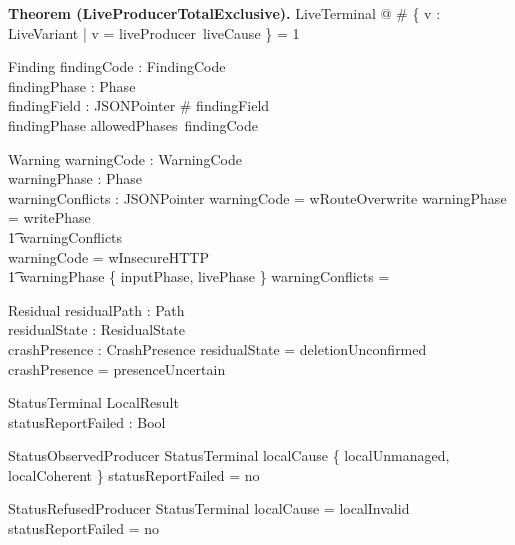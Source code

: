 \documentclass{article}
\makeatletter
\newenvironment{theorem}[1]{\medskip\noindent\textbf{Theorem (#1).}\@nameuse{zed}}{\@nameuse{endzed}}
\makeatother
\begin{document}
\begin{theorem}{LiveProducerTotalExclusive}
	\forall LiveTerminal @
	\# \{ v : LiveVariant | v = liveProducer~liveCause \} = 1
\end{theorem}

\begin{schema}{Finding}
	findingCode : FindingCode \\
	findingPhase : Phase \\
	findingField : \power JSONPointer
	\where
	\# findingField  \\
	findingPhase \in allowedPhases~findingCode
\end{schema}

\begin{schema}{Warning}
	warningCode : WarningCode \\
	warningPhase : Phase \\
	warningConflicts : \power JSONPointer
	\where
	warningCode = wRouteOverwrite \implies warningPhase = writePhase \land \\
	\t1 warningConflicts \neq \emptyset \\
	warningCode = wInsecureHTTP \implies \\
	\t1 warningPhase \in \{ inputPhase, livePhase \} \land
	warningConflicts = \emptyset
\end{schema}

\begin{schema}{Residual}
	residualPath : Path \\
	residualState : ResidualState \\
	crashPresence : CrashPresence
	\where
	residualState = deletionUnconfirmed \implies crashPresence = presenceUncertain
\end{schema}

\begin{schema}{StatusTerminal}
	LocalResult \\
	statusReportFailed : Bool
\end{schema}

\begin{schema}{StatusObservedProducer}
	StatusTerminal
	\where
	localCause \in \{ localUnmanaged, localCoherent \} \land
	statusReportFailed = no
\end{schema}

\begin{schema}{StatusRefusedProducer}
	StatusTerminal
	\where
	localCause = localInvalid \land statusReportFailed = no
\end{schema}
\end{document}

